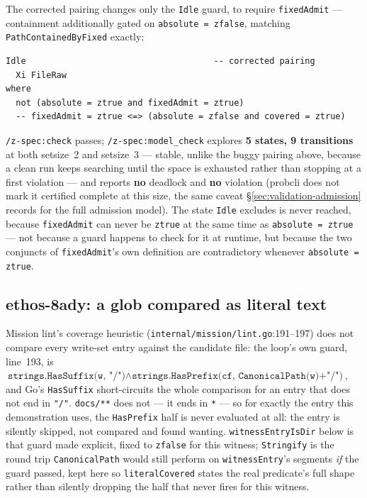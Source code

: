 \documentclass[a4paper,10pt,fleqn]{article}
\newcommand{\fpath}[1]{\texttt{#1}}
\newcommand{\field}[1]{\texttt{#1}}
\begin{document}
The corrected pairing changes only the \field{Idle} guard, to require
\field{fixedAdmit} --- containment additionally gated on
\field{absolute = zfalse}, matching \field{PathContainedByFixed}
exactly:

\begin{verbatim}
Idle                                     -- corrected pairing
  Xi FileRaw
where
  not (absolute = ztrue and fixedAdmit = ztrue)
  -- fixedAdmit = ztrue <=> (absolute = zfalse and covered = ztrue)
\end{verbatim}

\texttt{/z-spec:check} passes; \texttt{/z-spec:model\_check} explores
\textbf{5 states, 9 transitions} at both setsize~2 and setsize~3 ---
stable, unlike the buggy pairing above, because a clean run keeps
searching until the space is exhausted rather than stopping at a
first violation --- and reports \textbf{no} deadlock and \textbf{no}
violation (probcli does not mark it certified complete at this size,
the same caveat \S\ref{sec:validation-admission} records for the
full admission model). The state \field{Idle} excludes is never
reached, because \field{fixedAdmit} can never be \field{ztrue} at the
same time as \field{absolute = ztrue} --- not because a guard happens
to check for it at runtime, but because the two conjuncts of
\field{fixedAdmit}'s own definition are contradictory whenever
\field{absolute = ztrue}.

\subsection{ethos-8ady: a glob compared as literal text}
\label{sec:validation-8ady}

Mission lint's coverage heuristic
(\fpath{internal/mission/lint.go}:191--197) does not compare every
write-set entry against the candidate file: the loop's own guard,
line~193, is $\field{strings.HasSuffix(w, "/")} \land
\field{strings.HasPrefix(cf, CanonicalPath(w)+"/")}$, and Go's
\field{HasSuffix} short-circuits the whole comparison for an entry
that does not end in \texttt{"/"}. \texttt{docs/**} does not ---
it ends in \texttt{*} --- so for exactly the entry this demonstration
uses, the \field{HasPrefix} half is never evaluated at all: the entry
is silently skipped, not compared and found wanting.
\field{witnessEntryIsDir} below is that guard made explicit, fixed to
\field{zfalse} for this witness; \field{Stringify} is the round trip
\field{CanonicalPath} would still perform on \field{witnessEntry}'s
segments \emph{if} the guard passed, kept here so \field{literalCovered}
states the real predicate's full shape rather than silently dropping
the half that never fires for this witness.
\end{document}
